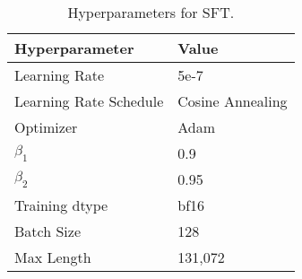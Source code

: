 \begin{table}[h]
    \centering
    \caption{Hyperparameters for SFT.}
    \small
    \begin{tabular}{l|l}
        \toprule
        \textbf{Hyperparameter} & \textbf{Value} \\
        \midrule
        Learning Rate & 5e-7 \\
        Learning Rate Schedule & Cosine Annealing \\
        Optimizer & Adam \\
        $\beta_1$ & 0.9 \\
        $\beta_2$ & 0.95 \\
        Training dtype & bf16 \\
        Batch Size & 128 \\
        Max Length & 131,072 \\
        \bottomrule
    \end{tabular}
    \label{tab:hyperparameters_sft}
\end{table}